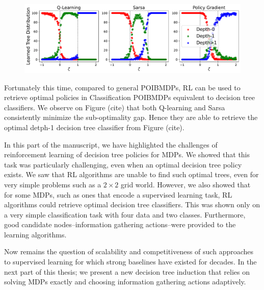 \begin{figure}
    \centering
    \includegraphics[width=1\textwidth]{images/images_part1/tree_distributions_classif.pdf}
    \caption{}\label{fig:tree-distrib-classif-poibmdp}
\end{figure}

Fortunately this time, compared to general POIBMDPs, RL can be used to retrieve optimal policies in Classification POIBMDPs equivalent to decision tree classifiers.
We observe on Figure (cite) that both Q-learning and Sarsa consistently minimize the sub-optimality gap. 
Hence they are able to retrieve the optimal detph-1 decision tree classifier from Figure (cite).

In this part of the manuscript, we have highlighted the challenges of reinforcement learning of decision tree policies for MDPs.
We showed that this task was particularly challenging, even when an optimal decision tree policy exists.
We saw that RL algorithms are unable to find such optimal trees, even for very simple problems such as a $2\times 2$ grid world.
However, we also showed that for some MDPs, such as ones that encode a supervised learning task, RL algorithms could retrieve optimal decision tree classifiers.
This was shown only on a very simple classification task with four data and two classes.
Furthermore, good candidate nodes--information gathering actions--were provided to the learning algorithms.

Now remains the question of scalability and competitiveness of such approaches to supervised learning for which strong baselines have existed for decades.
In the next part of this thesis; we present a new decision tree induction that relies on solving MDPs exactly and choosing information gathering actions adaptively.



